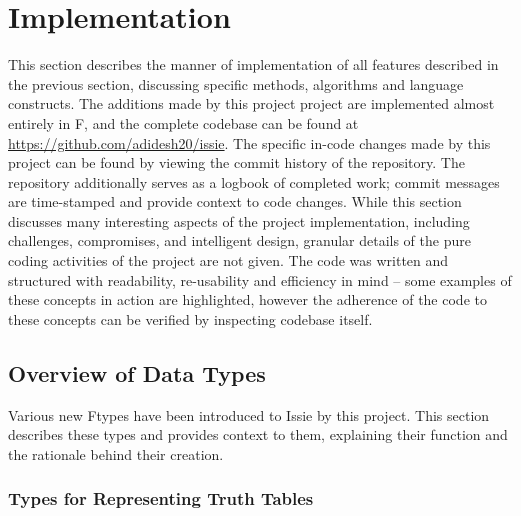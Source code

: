 \chapter{Implementation}

This section describes the manner of implementation of all features described in the previous section, discussing specific methods, algorithms and language constructs.
The additions made by this project project are implemented almost entirely in F\fsharp, and the complete codebase can be found at \url{https://github.com/adidesh20/issie}. The specific in-code changes made by this project can be found by viewing the commit history of the repository. The repository additionally serves as a logbook of completed work; commit messages are time-stamped and provide context to code changes. While this section discusses many interesting aspects of the project implementation, including challenges, compromises, and intelligent design, granular details of the pure coding activities of the project are not given. The code was written and structured with readability, re-usability and efficiency in mind -- some examples of these concepts in action are highlighted, however the adherence of the code to these concepts can be verified by inspecting codebase itself. 

\section{Overview of Data Types}
Various new F\fsharp types have been introduced to Issie by this project. This section describes these types and provides context to them, explaining their function and the rationale behind their creation.

\subsection{Types for Representing Truth Tables}
\newcommand{\ttCellData}{
    Discriminated Union type representing what data each truth table cell can hold. Cells can hold Bits (represented by Issie's WireData type), Algebraic expressions (represented by strings), or a Don't Care.
}

\newcommand{\ttCellIO}{
    Discriminated Union type representing which input or output of the logic the data belongs to. \codestyle{CellIO}s can either be the existing \codestyle{SimulationIO} type used to describe Inputs and Outputs, or Viewers.
}

